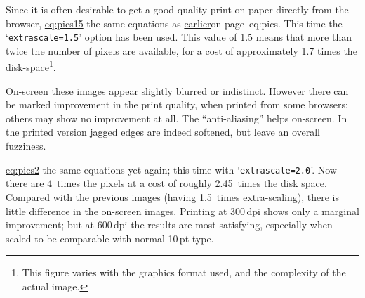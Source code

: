 \begin{latexonly}
\noindent
Since it is often desirable to get a good quality print on paper
directly from the browser, \hyperref{here are}{Figure~}{ shows}{eq:pics15}
the same equations as \hyperref[page]{earlier}{on page~}{}{eq:pics}.
This time the `\texttt{extrascale=1.5}' option has been used. This value of 1.5
means that more than twice the number of pixels are available,
for a cost of approximately 1.7 times the disk-space\footnote{This figure
varies with the graphics format used, and the complexity of the actual image.}.
\end{latexonly}
\noindent
On-screen these images appear slightly blurred or indistinct. 
However there can be marked improvement in the print quality,
when printed from some browsers; others may show no improvement at all. 
The ``anti-aliasing'' helps on-screen. In the printed version
jagged edges are indeed softened, but leave an overall fuzziness. 


\hyperref{Here are}{Figure~}{ shows}{eq:pics2} 
the same equations yet again; this time with `\texttt{extrascale=2.0}'.
Now there are 4~times the pixels at a cost of roughly 2.45~times the disk space.
Compared with the previous images (having 1.5~times extra-scaling), 
there is little difference in the on-screen images.
Printing at 300\,dpi shows only a marginal improvement;
but at 600\,dpi the results are most satisfying, especially when
scaled to be comparable with normal 10\,pt type.

